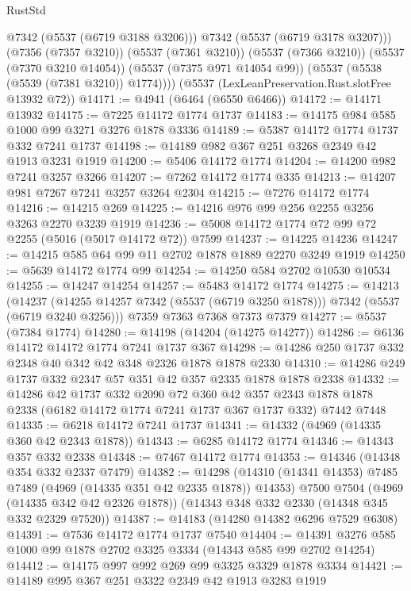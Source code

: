 \begin{lexlean}{RustStd}
\begin{coremodule}
            @7342
            (@5537 (@6719 @3188 @3206)))
          @7342
          (@5537 (@6719 @3178 @3207)))
        (@7356 (@7357 @3210))
        (@5537 (@7361 @3210))
        (@5537 (@7366 @3210))
        (@5537 (@7370 @3210 @14054))
        (@5537 (@7375 @971 @14054 @99))
        (@5537 (@5538 (@5539 (@7381 @3210)) @1774))))
    (@5537 (LexLeanPreservation.Rust.slotFree @13932 @72))
@14171 := @4941 (@6464 (@6550 @6466))
@14172 := @14171 @13932
@14175 := @7225 @14172 @1774 @1737
@14183 := @14175 @984 @585 @1000 @99 @3271 @3276 @1878 @3336
@14189 := @5387 @14172 @1774 @1737 @332 @7241 @1737
@14198 := @14189 @982 @367 @251 @3268 @2349 @42 @1913 @3231 @1919
@14200 := @5406 @14172 @1774
@14204 := @14200 @982 @7241 @3257 @3266
@14207 := @7262 @14172 @1774 @335
@14213 := @14207 @981 @7267 @7241 @3257 @3264 @2304
@14215 := @7276 @14172 @1774
@14216 := @14215 @269
@14225 := @14216 @976 @99 @256 @2255 @3256 @3263 @2270 @3239 @1919
@14236 := @5008 @14172 @1774 @72 @99 @72 @2255 (@5016 (@5017 @14172 @72)) @7599
@14237 := @14225 @14236
@14247 := @14215 @585 @64 @99 @11 @2702 @1878 @1889 @2270 @3249 @1919
@14250 := @5639 @14172 @1774 @99
@14254 := @14250 @584 @2702 @10530 @10534
@14255 := @14247 @14254
@14257 := @5483 @14172 @1774
@14275 := @14213
    (@14237 (@14255 @14257 @7342 (@5537 (@6719 @3250 @1878))) @7342 (@5537 (@6719 @3240 @3256)))
    @7359
    @7363
    @7368
    @7373
    @7379
@14277 := @5537 (@7384 @1774)
@14280 := @14198 (@14204 (@14275 @14277))
@14286 := @6136 @14172 @14172 @1774 @7241 @1737 @367
@14298 := @14286 @250 @1737 @332 @2348 @40 @342 @42 @348 @2326 @1878 @1878 @2330
@14310 := @14286 @249 @1737 @332 @2347 @57 @351 @42 @357 @2335 @1878 @1878 @2338
@14332 := @14286
    @42
    @1737
    @332
    @2090
    @72
    @360
    @42
    @357
    @2343
    @1878
    @1878
    @2338
    (@6182 @14172 @1774 @7241 @1737 @367 @1737 @332)
    @7442
    @7448
@14335 := @6218 @14172 @7241 @1737
@14341 := @14332 (@4969 (@14335 @360 @42 @2343 @1878))
@14343 := @6285 @14172 @1774
@14346 := @14343 @357 @332 @2338
@14348 := @7467 @14172 @1774
@14353 := @14346 (@14348 @354 @332 @2337 @7479)
@14382 := @14298
    (@14310 (@14341 @14353) @7485 @7489 (@4969 (@14335 @351 @42 @2335 @1878)) @14353)
    @7500
    @7504
    (@4969 (@14335 @342 @42 @2326 @1878))
    (@14343 @348 @332 @2330 (@14348 @345 @332 @2329 @7520))
@14387 := @14183 (@14280 @14382 @6296 @7529 @6308)
@14391 := @7536 @14172 @1774 @1737 @7540
@14404 := @14391 @3276 @585 @1000 @99 @1878 @2702 @3325 @3334 (@14343 @585 @99 @2702 @14254)
@14412 := @14175 @997 @992 @269 @99 @3325 @3329 @1878 @3334
@14421 := @14189 @995 @367 @251 @3322 @2349 @42 @1913 @3283 @1919

\end{coremodule}
\end{lexlean}
